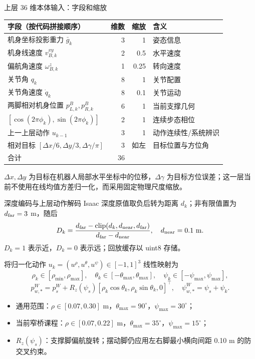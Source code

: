 \documentclass[aspectratio=169,10pt]{beamer}
\begin{document}
\begin{frame}{上层 36 维本体输入：字段和缩放}
\scriptsize
\begin{tabular}{p{}rrp{}}
\toprule
字段（按代码拼接顺序） & 维数 & 缩放 & 含义\\
\midrule
机身坐标投影重力 $\bar g_k$ & 3 & 1 & 姿态信息\\
机身线速度 $v^{xy}_{B,k}$ & 2 & 0.5 & 水平速度\\
偏航角速度 $\omega^z_{B,k}$ & 1 & 0.25 & 转向速度\\
关节角 $q_k$ & 8 & 1 & 关节配置\\
关节角速度 $\dot q_k$ & 8 & 0.1 & 关节运动\\
两脚相对机身位置 $p^B_{L,k},p^B_{R,k}$ & 6 & 1 & 当前支撑几何\\
$[\cos(2\pi\phi_k),\sin(2\pi\phi_k)]$ & 2 & 1 & 连续步态相位\\
上一上层动作 $u_{k-1}$ & 3 & 1 & 动作连续性/系统辨识\\
相对目标 $[\Delta x/6,\Delta y/3,\Delta\gamma/\pi]$ & 3 & 如左 & 目标位置与方位角\\
\midrule
合计 & 36 &&\\
\bottomrule
\end{tabular}
\vspace{0.5em}
$\Delta x,\Delta y$ 为目标在机器人局部水平坐标中的位移，$\Delta\gamma$ 为目标方位误差；这一层当前不使用在线均值方差归一化，而采用固定物理尺度缩放。
\end{frame}

\begin{frame}{深度编码与上层动作解码}
\scriptsize
Isaac 深度原值取负后转为距离 $d_k$；非有限值置为 $d_{\rm far}=3$ m，随后
\[
D_k=\frac{d_{\rm far}-\operatorname{clip}(d_k,d_{\rm near},d_{\rm far})}
{d_{\rm far}-d_{\rm near}},\quad d_{\rm near}=0.1\ \mathrm m.
\]
$D_k=1$ 表示近，$D_k=0$ 表示远；回放缓存以 uint8 存储。

将归一化动作 $u_k=(u^\rho,u^\theta,u^\psi)\in[-1,1]^3$ 线性映射为
\[
\rho_k\in[\rho_{\min},\rho_{\max}],\quad
\theta_k\in[-\theta_{\max},\theta_{\max}],\quad
\psi_k\in[-\psi_{\max},\psi_{\max}],
\]
\[
p^W_{w,*}=p^W_s+R_z(\psi_s)[\rho_k\cos\theta_k,\rho_k\sin\theta_k,0]^\top,
\quad \psi^W_{w,*}=\psi_s+\psi_k.
\]
\begin{itemize}
  \item 通用范围：$\rho\in[0.07,0.30]$ m，$\theta_{\max}=90^\circ$，$\psi_{\max}=30^\circ$；
  \item 当前窄桥课程：$\rho\in[0.07,0.22]$ m，$\theta_{\max}=35^\circ$，$\psi_{\max}=15^\circ$；
  \item $R_z(\psi_s)$：支撑脚偏航旋转；摆动脚仍应用左右脚最小横向间距 0.10 m 的防交叉约束。
\end{itemize}
\end{frame}
\end{document}
